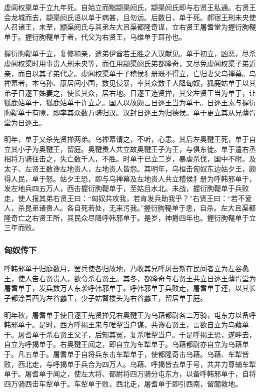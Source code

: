 \documentclass[]{article}
\begin{document}
虚闾权渠单于立九年死。自始立而黜颛渠阏氏，颛渠阏氏即与右贤王私通。右贤王会龙城而去，颛渠阏氏语以单于病甚，且勿远。后数日，单于死。郝宿王刑未央使人召诸王，未至，颛渠阏氏与其弟左大且渠都隆奇谋，立右贤王屠耆堂为握衍朐鞮单于。握衍朐鞮单于者，代父为右贤王，乌维单于耳孙也。

握衍朐鞮单于立，复修和亲，遣弟伊酋若王胜之入汉献见。单于初立，凶恶，尽杀虚闾权渠时用事贵人刑未央等，而任用颛渠阏氏弟都隆奇，又尽免虚闾权渠子弟近亲，而自以其子弟代之。虚闾权渠单于子稽侯犭册既不得立，亡归妻父乌禅幕。乌禅幕者，本乌孙、康居间小国，数见侵暴，率其众数千人降匈奴，狐鹿姑单于以其弟子日逐王姊妻之，使长其众，居右地。日逐王选贤掸，其父左贤王当为单于，让狐鹿姑单于，狐鹿姑单于许立之。国人以故颇言日逐王当为单于。日逐王素与握衍朐鞮单于有隙，即率其众数万骑归汉。汉封日逐王为归德侯。单于更立其从兄薄胥堂为日逐王。

明年，单于又杀先贤掸两弟。乌禅幕请之，不听，心恚。其后左奥鞬王死，单于自立其小子为奥鞬王，留庭。奥鞬贵人共立故奥鞬王子为王，与俱东徙。单于遣右丞相将万骑往击之，失亡数千人，不胜。时单于已立二岁，暴虐杀伐，国中不附。及太子、左贤王数谗左地贵人，左地贵人皆怨。其明年，乌桓击匈奴东边姑夕王，颇得人民，单于怒。姑夕王恐，即与乌禅幕及左地贵人共立稽侯犭册为呼韩邪单于，发左地兵四五万人，西击握衍朐鞮单于，至姑且水北。未战，握衍朐鞮单于兵败走，使人报其弟右贤王曰：``匈奴共攻我，若肯发兵助我乎？''右贤王曰：``若不爱人，杀昆弟诸贵人。各自死若处，无来污我。''握衍朐鞮单于恚，自杀。左大且渠都隆奇亡之右贤王所，其民众尽降呼韩邪单于。是岁，神爵四年也。握衍朐鞮单于立三年而败。

\hypertarget{header-n6257}{%
\subsubsection{匈奴传下}\label{header-n6257}}

呼韩邪单于归庭数月，罢兵使各归故地，乃收其兄呼屠吾斯在民间者立为左谷蠡王，使人告右贤贵人，欲令杀右贤王。其冬，都隆奇与右贤王共立日逐王薄胥堂为屠耆单于，发兵数万人东袭呼韩邪单于。呼韩邪单于兵败走，屠耆单于还，以其长子都涂吾西为左谷蠡王，少子姑瞀楼头为右谷蠡王，留居单于庭。

明年秋，屠耆单于使日逐王先贤掸兄右奥鞬王为乌藉都尉各二万骑，屯东方以备呼韩邪单于。是时，西方呼揭王来与唯犁当户谋，共谗右贤王，言欲自立为乌藉单于。屠耆单于杀右贤王父子，后知其冤，复杀唯犁当户。于是呼揭王恐，遂畔去，自立为呼揭单于。右奥鞬王闻之，即自立为车犁单于。乌藉都尉亦自立为乌藉单于。凡五单于。屠耆单于自将兵东击车犁单于，使都隆奇击乌藉。乌藉、车犁皆败，西北走，与呼揭单于兵合为四万人。乌藉、呼揭皆去单于号，共并力尊辅车犁单于。屠耆单于闻之，使左大将、都尉将四万骑分屯东方，以备呼韩邪单于，自将四万骑西击车犁单于。车犁单于败，西北走，屠耆单于即引西南，留闟敦地。
\end{document}
